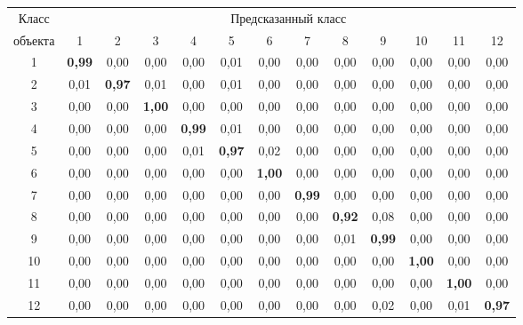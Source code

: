 \begin{table*}
\begin{center}
\begin{tabular}{|c|c|c|c|c|c|c|c|c|c|c|c|c|}
  \hline
Класс & \multicolumn{12}{c|}{Предсказанный класс} \\ 
\cline{2-13}
объекта & 1 & 2 & 3 & 4 & 5 & 6 & 7 & 8 & 9 & 10 & 11 & 12\\ 
\hline
 1& \textbf{0{,}99} & 0,00 & 0,00 & 0,00 & 0,01 & 0,00 & 0,00 & 0,00 & 0,00 & 0,00 & 0,00 & 0,00\\ 
 2& 0,01 & \textbf{0{,}97} & 0,01 & 0,00 & 0,01 & 0,00 & 0,00 & 0,00 & 0,00 & 0,00 & 0,00 & 0,00\\ 
 3& 0,00 & 0,00 & \textbf{1{,}00} & 0,00 & 0,00 & 0,00 & 0,00 & 0,00 & 0,00 & 0,00 & 0,00 & 0,00\\ 
 4& 0,00 & 0,00 & 0,00 & \textbf{0{,}99} & 0,01 & 0,00 & 0,00 & 0,00 & 0,00 & 0,00 & 0,00 & 0,00\\ 
 5& 0,00 & 0,00 & 0,00 & 0,01 & \textbf{0{,}97} & 0,02 & 0,00 & 0,00 & 0,00 & 0,00 & 0,00 & 0,00\\ 
 6& 0,00 & 0,00 & 0,00 & 0,00 & 0,00 & \textbf{1{,}00} & 0,00 & 0,00 & 0,00 & 0,00 & 0,00 & 0,00\\ 
 7& 0,00 & 0,00 & 0,00 & 0,00 & 0,00 & 0,00 & \textbf{0{,}99} & 0,00 & 0,00 & 0,00 & 0,00 & 0,00\\ 
 8& 0,00 & 0,00 & 0,00 & 0,00 & 0,00 & 0,00 & 0,00 & \textbf{0{,}92} & 0,08 & 0,00 & 0,00 & 0,00\\ 
 9& 0,00 & 0,00 & 0,00 & 0,00 & 0,00 & 0,00 & 0,00 & 0,01 & \textbf{0{,}99} & 0,00 & 0,00 & 0,00\\ 
 10\hphantom{9} & 0,00 & 0,00 & 0,00 & 0,00 & 0,00 & 0,00 & 0,00 & 0,00 & 0,00 & \textbf{1{,}00} & 0,00 & 0,00\\ 
 11\hphantom{9} & 0,00 & 0,00 & 0,00 & 0,00 & 0,00& 0,00 & 0,00 & 0,00 & 0,00 & 0,00 & 
 \textbf{1{,}00} & 0,00\\ 
 12\hphantom{9} & 0,00 & 0,00 & 0,00 & 0,00 & 0,00 &0,00 & 0,00 & 0,00 & 0,02 & 0,00 & 0,01 & \textbf{0{,}97}\\ 
 \hline
\end{tabular}
\end{center}
\end{table*}
\begin{figure*} %
\vspace*{1pt}
\begin{center}
\mbox{%
\epsfxsize=87.865mm
}
\end{center}
\vspace*{-9pt}
\label{fig:USCHAD_AR_VOTING_VS_DISTR}
\end{figure*}

